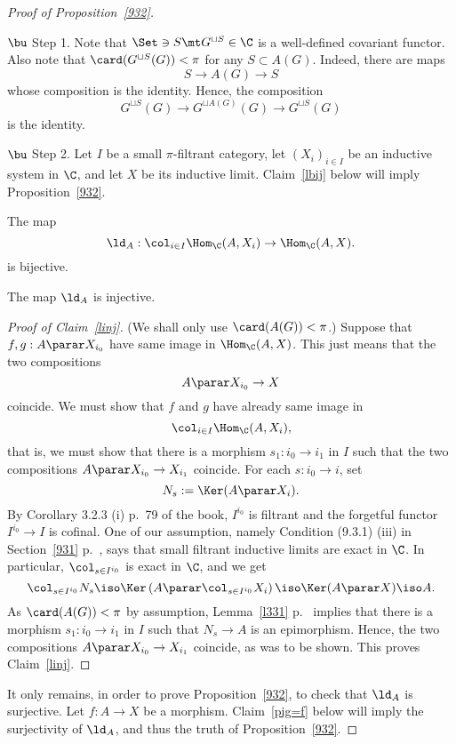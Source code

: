 \documentclass[12pt]{article}
\theoremstyle{remark}
\theoremstyle{definition}
\begin{document}
\begin{proof}[Proof of Proposition~\ref{932}]${}$ 

\nn$\bu$ Step 1. Note that $\Set\ni S\mt G^{\sqcup S}\in\C$ is a well-defined covariant functor. Also note that $\card(G^{\sqcup S}(G))<\pi$ for any $S\subset A(G)$. Indeed, there are maps 
$$
S\to A(G)\to S
$$ 
whose composition is the identity. Hence, the composition 
$$
G^{\sqcup S}(G)\to G^{\sqcup A(G)}(G)\to G^{\sqcup S}(G)
$$ 
is the identity.

\nn$\bu$ Step 2. Let $I$ be a small $\pi$-filtrant category, let $(X_i)_{i\in I}$ be an inductive system in $\C$, and let $X$ be its inductive limit. Claim~\ref{lbij} below will imply Proposition~\ref{932}. 

\begin{claim} 
The map 
$$
\ld_A:\col_{i\in I}\Hom_\C(A,X_i)\to\Hom_\C(A,X).
$$ 
is bijective. 
\end{claim}

\begin{claim} 
The map $\ld_A$ is injective. 
\end{claim} 

\begin{proof}[Proof of Claim~\ref{linj}] 
(We shall only use $\card(A(G))<\pi$.) Suppose that $f,g:A\parar X_{i_0}$ have same image in $\Hom_\C(A,X)$. This just means that the two compositions 
$$
A\parar X_{i_0}\to X
$$ 
coincide. We must show that $f$ and $g$ have already same image in 
$$
\col_{i\in I}\Hom_\C(A,X_i),
$$ 
that is, we must show that there is a morphism $s_1:i_0\to i_1$ in $I$ such that the two compositions $A\parar X_{i_0}\to X_{i_1}$ coincide. For each $s:i_0\to i$, set 
$$
N_s:=\Ker(A\parar X_i).
$$ 
By Corollary 3.2.3 (i) p.~79 of the book, $I^{i_0}$ is filtrant and the forgetful functor $I^{i_0}\to I$ is cofinal. One of our assumption, namely Condition (9.3.1) (iii) in Section~\ref{931} p.~, says that small filtrant inductive limits are exact in $\C$. In particular, $\col_{s\in I^{i_0}}$ is exact in $\C$, and we get  
$$
\col_{s\in I^{i_0}}N_s\iso\Ker\left(A\parar\col_{s\in I^{i_0}}X_i\right)\iso\Ker(A\parar X)\iso A. 
$$ 
As $\card(A(G))<\pi$ by assumption, Lemma~\ref{l331} p.~ implies that there is a morphism $s_1:i_0\to i_1$ in $I$ such that $N_s\to A$ is an epimorphism. Hence, the two compositions $A\parar X_{i_0}\to X_{i_1}$ coincide, as was to be shown. This proves Claim~\ref{linj}. 
\end{proof} 

It only remains, in order to prove Proposition~\ref{932}, to check that $\ld_A$ is surjective. Let $f:A\to X$ be a morphism. Claim~\ref{pig=f} below will imply the surjectivity of $\ld_A$, and thus the truth of Proposition~\ref{932}. 


\end{proof}
\end{document}
